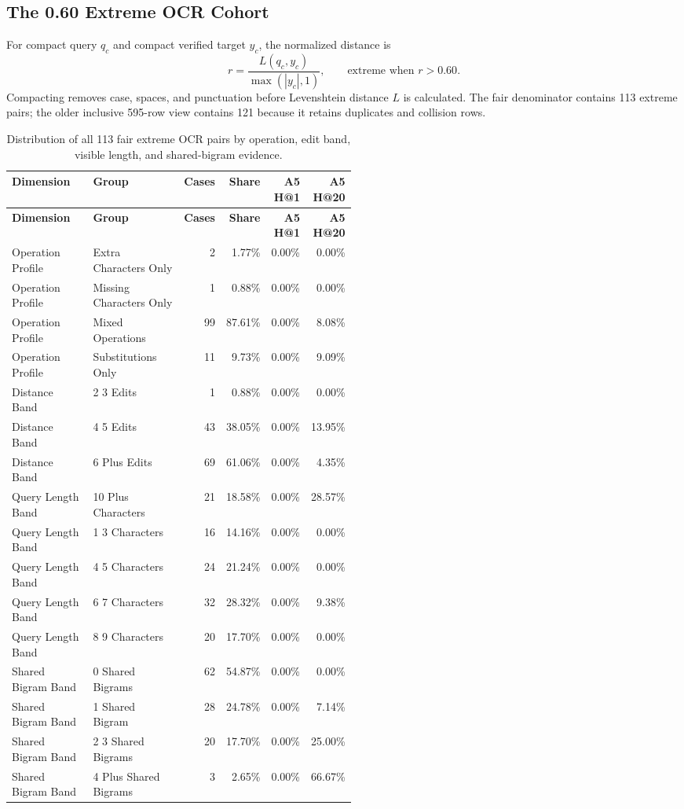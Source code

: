 \subsection{The 0.60 Extreme OCR Cohort}
For compact query $q_c$ and compact verified target $y_c$, the normalized distance is
\[r=\frac{L(q_c,y_c)}{\max(|y_c|,1)},\qquad \text{extreme when }r>0.60.\]
Compacting removes case, spaces, and punctuation before Levenshtein distance $L$ is calculated. The fair denominator contains 113 extreme pairs; the older inclusive 595-row view contains 121 because it retains duplicates and collision rows.

\begin{scriptsize}
\setlength{\tabcolsep}{1.5pt}
\renewcommand{\arraystretch}{1.05}
\begin{longtable}{@{}L{0.24\linewidth}L{0.27\linewidth}rrrr@{}}
\caption{Distribution of all 113 fair extreme OCR pairs by operation, edit band, visible length, and shared-bigram evidence.}\label{tab:expanded-extreme-distribution}\\
\toprule
\textbf{Dimension} & \textbf{Group} & \textbf{Cases} & \textbf{Share} & \textbf{A5 H@1} & \textbf{A5 H@20} \\
\midrule
\endfirsthead
\toprule
\textbf{Dimension} & \textbf{Group} & \textbf{Cases} & \textbf{Share} & \textbf{A5 H@1} & \textbf{A5 H@20} \\
\midrule
\endhead
Operation Profile & Extra Characters Only & 2 & 1.77\% & 0.00\% & 0.00\% \\
Operation Profile & Missing Characters Only & 1 & 0.88\% & 0.00\% & 0.00\% \\
Operation Profile & Mixed Operations & 99 & 87.61\% & 0.00\% & 8.08\% \\
Operation Profile & Substitutions Only & 11 & 9.73\% & 0.00\% & 9.09\% \\
Distance Band & 2 3 Edits & 1 & 0.88\% & 0.00\% & 0.00\% \\
Distance Band & 4 5 Edits & 43 & 38.05\% & 0.00\% & 13.95\% \\
Distance Band & 6 Plus Edits & 69 & 61.06\% & 0.00\% & 4.35\% \\
Query Length Band & 10 Plus Characters & 21 & 18.58\% & 0.00\% & 28.57\% \\
Query Length Band & 1 3 Characters & 16 & 14.16\% & 0.00\% & 0.00\% \\
Query Length Band & 4 5 Characters & 24 & 21.24\% & 0.00\% & 0.00\% \\
Query Length Band & 6 7 Characters & 32 & 28.32\% & 0.00\% & 9.38\% \\
Query Length Band & 8 9 Characters & 20 & 17.70\% & 0.00\% & 0.00\% \\
Shared Bigram Band & 0 Shared Bigrams & 62 & 54.87\% & 0.00\% & 0.00\% \\
Shared Bigram Band & 1 Shared Bigram & 28 & 24.78\% & 0.00\% & 7.14\% \\
Shared Bigram Band & 2 3 Shared Bigrams & 20 & 17.70\% & 0.00\% & 25.00\% \\
Shared Bigram Band & 4 Plus Shared Bigrams & 3 & 2.65\% & 0.00\% & 66.67\% \\
\bottomrule
\end{longtable}
\end{scriptsize}

